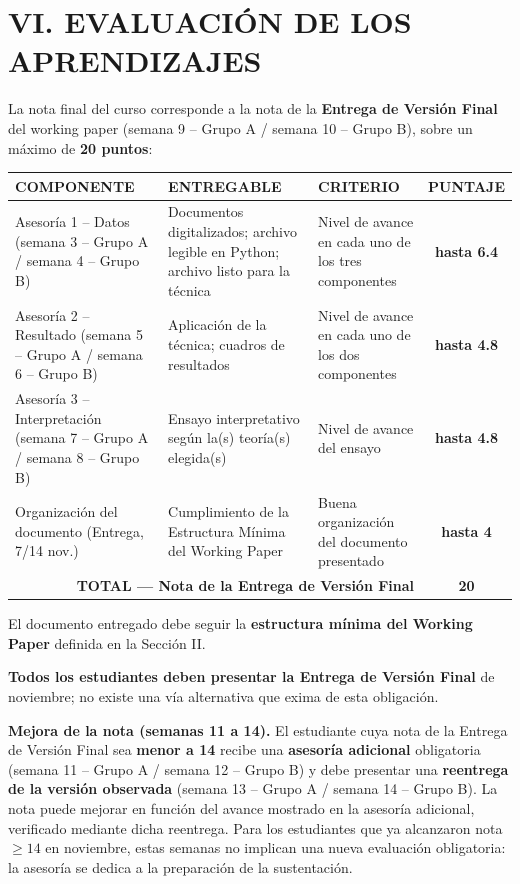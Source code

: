 \documentclass[11pt,a4paper]{article}
\begin{document}
\section{VI. EVALUACIÓN DE LOS APRENDIZAJES}

La nota final del curso corresponde a la nota de la \textbf{Entrega de Versión Final} del working paper (semana 9 -- Grupo A / semana 10 -- Grupo B), sobre un máximo de \textbf{20 puntos}:

\begin{table}[ht!]
\centering
\begin{tabularx}{\textwidth}{|X|X|X|c|}
\hline
\textbf{COMPONENTE} & \textbf{ENTREGABLE} & \textbf{CRITERIO} & \textbf{PUNTAJE} \\ \hline
Asesoría 1 -- Datos (semana 3 -- Grupo A / semana 4 -- Grupo B) & Documentos digitalizados; archivo legible en Python; archivo listo para la técnica & Nivel de avance en cada uno de los tres componentes & \textbf{hasta 6.4} \\ \hline
Asesoría 2 -- Resultado (semana 5 -- Grupo A / semana 6 -- Grupo B) & Aplicación de la técnica; cuadros de resultados & Nivel de avance en cada uno de los dos componentes & \textbf{hasta 4.8} \\ \hline
Asesoría 3 -- Interpretación (semana 7 -- Grupo A / semana 8 -- Grupo B) & Ensayo interpretativo según la(s) teoría(s) elegida(s) & Nivel de avance del ensayo & \textbf{hasta 4.8} \\ \hline
Organización del documento (Entrega, 7/14 nov.) & Cumplimiento de la Estructura Mínima del Working Paper & Buena organización del documento presentado & \textbf{hasta 4} \\ \hline
\multicolumn{3}{|r|}{\textbf{TOTAL --- Nota de la Entrega de Versión Final}} & \textbf{20} \\ \hline
\end{tabularx}
\end{table}

\noindent
El documento entregado debe seguir la \textbf{estructura mínima del Working Paper} definida en la Sección II.

\noindent
\textbf{Todos los estudiantes deben presentar la Entrega de Versión Final} de noviembre; no existe una vía alternativa que exima de esta obligación.

\noindent
\textbf{Mejora de la nota (semanas 11 a 14).} El estudiante cuya nota de la Entrega de Versión Final sea \textbf{menor a 14} recibe una \textbf{asesoría adicional} obligatoria (semana 11 -- Grupo A / semana 12 -- Grupo B) y debe presentar una \textbf{reentrega de la versión observada} (semana 13 -- Grupo A / semana 14 -- Grupo B). La nota puede mejorar en función del avance mostrado en la asesoría adicional, verificado mediante dicha reentrega. Para los estudiantes que ya alcanzaron nota $\geq 14$ en noviembre, estas semanas no implican una nueva evaluación obligatoria: la asesoría se dedica a la preparación de la sustentación.
\end{document}
